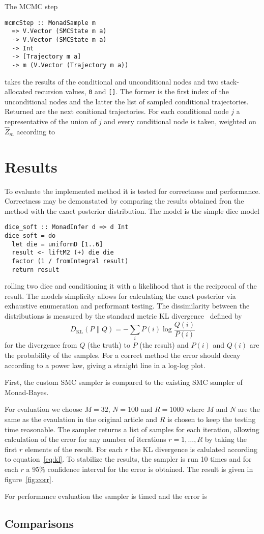 The MCMC step
\begin{verbatim}
mcmcStep :: MonadSample m
  => V.Vector (SMCState m a) 
  -> V.Vector (SMCState m a)
  -> Int
  -> [Trajectory m a]
  -> m (V.Vector (Trajectory m a))
\end{verbatim}
takes the results of the conditional and unconditional nodes and two stack-allocated recursion values, \texttt{0} and \texttt{[]}. The former is the first index of the unconditional nodes and the latter the list of sampled conditional trajectories. Returned are the next conitional trajectories. For each conditional node $j$ a representative of the union of $j$ and every conditional node is taken, weighted on $\hat Z_m$ according to

\section{Results}

To evaluate the implemented method it is tested for correctness and performance. Correctness may be demonstated by comparing the results obtained fron the method with the exact posterior distribution. The model is the simple dice model
\begin{verbatim}
dice_soft :: MonadInfer d => d Int
dice_soft = do
  let die = uniformD [1..6]
  result <- liftM2 (+) die die
  factor (1 / fromIntegral result)
  return result
\end{verbatim}
rolling two dice and conditioning it with a likelihood that is the reciprocal of the result. The models simplicity allows for calculating the exact posterior via exhaustive enumeration and performant testing. The dissimilarity between the distributions is measured by the standard metric KL divergence~\cite{kl} defined by
\begin{equation}\label{eq:kl}
    D_{\mathrm{KL}} (P \parallel Q) = - \sum\limits_i P(i) \log \frac {Q(i)}{P(i)}
\end{equation}
for the divergence from $Q$ (the truth) to $P$ (the result) and $P(i)$ and $Q(i)$ are the probability of the samples. For a correct method the error should decay according to a power law, giving a straight line in a log-log plot.

First, the custom SMC sampler is compared to the existing SMC sampler of Monad-Bayes. 

For evaluation we choose $M=32$, $N=100$ and $R=1000$ where $M$ and $N$ are the same as the evaulation in the original article and $R$ is chosen to keep the testing time reasonable. The sampler returns a list of samples for each iteration, allowing calculation of the error for any number of iterations $r=1,\dots,R$ by taking the first $r$ elements of the result. For each $r$ the KL divergence is calulated according to equation~\ref{eq:kl}. To stabilize the results, the sampler is run 10 times and for each $r$ a 95\% confidence interval for the error is obtained. The result is given in figure~\ref{fig:corr}.

For performance evaluation the sampler is timed and the error is 

\subsection{Comparisons}

